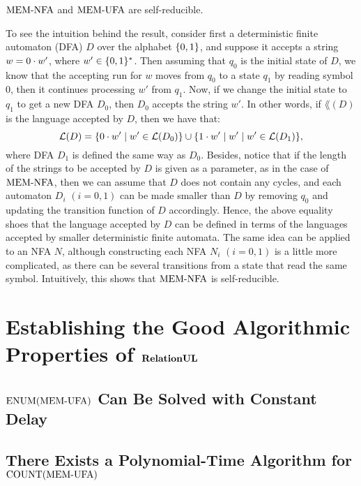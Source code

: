 \documentclass[11pt,twoside=off,numbers=noenddot]{scrbook}
\begin{document}
\begin{proposition}
    $\text{MEM-NFA}$ and $\text{MEM-UFA}$ are self-reducible.
\end{proposition}

\begin{proofidea}
    To see the intuition behind the result, consider first a deterministic finite automaton (DFA) $D$ over the alphabet $\{ 0, 1 \}$, and suppose it accepts a string $w = 0 \cdot w'$, where $w' \in \{ 0, 1 \}^\ast$. Then assuming that $q_0$ is the initial state of $D$, we know that the accepting run for $w$ moves from $q_0$ to a state $q_1$ by reading symbol $0$, then it continues processing $w'$ from $q_1$. Now, if we change the initial state to $q_1$ to get a new DFA $D_0$, then $D_0$ accepts the string $w'$. In other words, if $\lang(D)$ is the language accepted by $D$, then we have that:
    \[ \mathcal{L}(D) = \{ 0 \cdot w' \mid w' \in \mathcal{L}(D_0) \} \cup \{ 1 \cdot w' \mid w' \mid w' \in \mathcal{L}(D_1) \}, \]
    where DFA $D_1$ is defined the same way as $D_0$. Besides, notice that if the length of the strings to be accepted by $D$ is given as a parameter, as in the case of $\text{MEM-NFA}$, then we can assume that $D$ does not contain any cycles, and each automaton $D_i$ $(i = 0, 1)$ can be made smaller than $D$ by removing $q_0$ and updating the transition function of $D$ accordingly. Hence, the above equality shoes that the language accepted by $D$ can be defined in terms of the languages accepted by smaller deterministic finite automata. The same idea can be applied to an NFA $N$, although constructing each NFA $N_i$ $(i = 0, 1)$ is a little more complicated, as there can be several transitions from a state that read the same symbol. Intuitively, this shows that $\text{MEM-NFA}$ is self-reducible.
\end{proofidea}

\section{Establishing the Good Algorithmic Properties of $\textbf{RelationUL}$}

\subsection{$\text{ENUM}(\text{MEM-UFA})$ Can Be Solved with Constant Delay}

\subsection{There Exists a Polynomial-Time Algorithm for $\text{COUNT}(\text{MEM-UFA})$}
\end{document}

